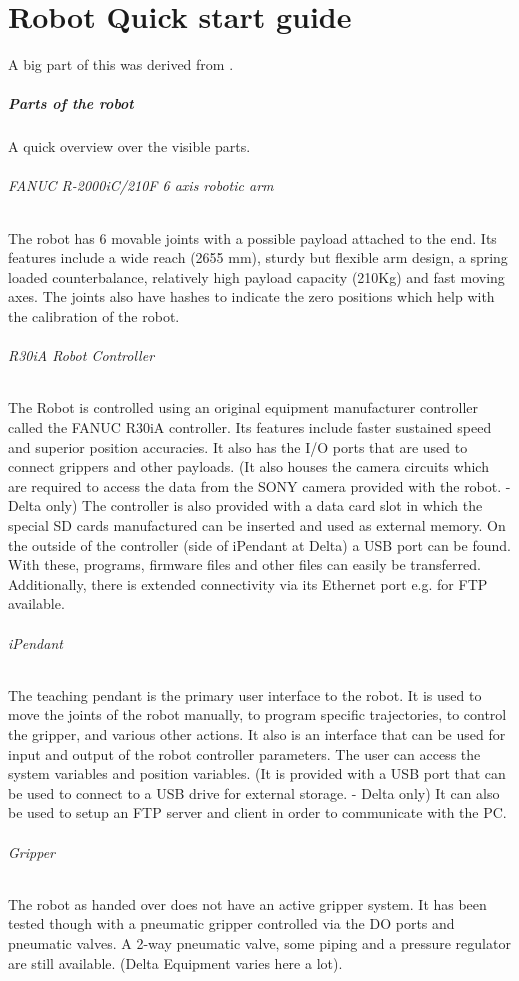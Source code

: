 \chapter{Robot Quick start guide}
A big part of this was derived from \cite{MatlabControl}.

\paragraph{Parts of the robot}
A quick overview over the visible parts.

\subparagraph{FANUC R-2000iC/210F 6 axis robotic arm}
The robot has 6 movable joints with a possible payload attached to the end. Its features include a wide reach (2655 mm), sturdy but flexible arm design, a spring loaded counterbalance, relatively high payload capacity (210Kg) and fast moving axes. The joints also have hashes to indicate the zero positions which help with the calibration of the robot. 

\subparagraph{R30iA Robot Controller }
The Robot is controlled using an original equipment manufacturer controller called the FANUC R30iA controller. Its features include faster sustained speed and superior position accuracies. It also has the I/O ports that are used to connect grippers and other payloads. (It also houses the camera circuits which are required to access the data from the SONY camera provided with the robot. - Delta only)  The controller is also provided with a data card slot in which the special SD cards manufactured can be inserted and used as external memory. On the outside of the controller (side of iPendant at Delta) a USB port can be found. With these, programs, firmware files and other files can easily be transferred. Additionally, there is extended connectivity via its Ethernet port e.g. for FTP available.

\subparagraph{iPendant}
The teaching pendant is the primary user interface to the robot. It is used to move the joints of the robot manually, to program specific trajectories, to control the gripper, and various other actions. It also is an interface that can be used for input and output of the robot controller parameters. The user can access the system variables and position variables. (It is provided with a USB port that can be used to connect to a USB drive for external storage. - Delta only) It can also be used to setup an FTP server and client in order to communicate with the PC. 

\subparagraph{Gripper}
The robot as handed over does not have an active gripper system. It has been tested though with a pneumatic gripper controlled via the DO ports and pneumatic valves. A 2-way pneumatic valve, some piping and a pressure regulator are still available. (Delta Equipment varies here a lot).


